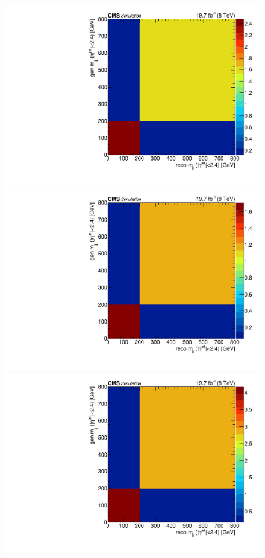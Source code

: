 \begin{figure}[hbtp]
  \begin{center}
    \includegraphics[width=\cmsFigWidth]{Figures/ResMat_qqggJJ_CentralMjj_ZZTo4m_st_01_fr_Mad}
    \includegraphics[width=\cmsFigWidth]{Figures/ResMat_qqggJJ_CentralMjj_ZZTo4e_st_01_fr_Mad}
    \includegraphics[width=\cmsFigWidth]{Figures/ResMat_qqggJJ_CentralMjj_ZZTo2e2m_st_01_fr_Mad}     

\end{center}
\end{figure}
